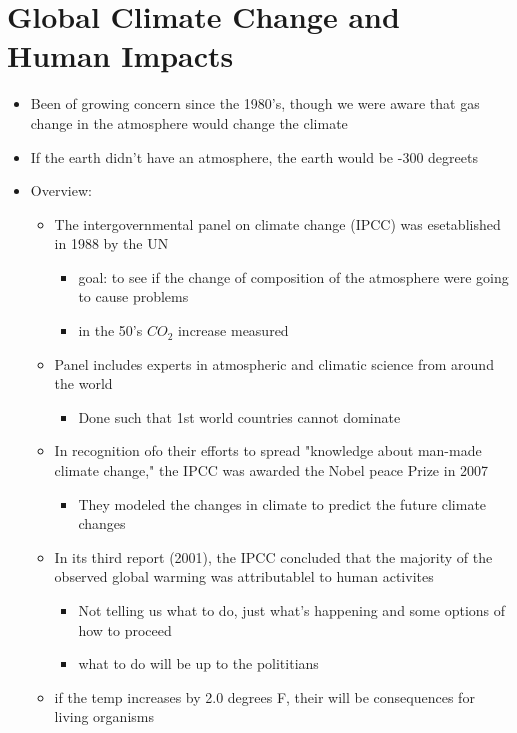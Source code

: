 \documentclass{article}
\theoremstyle{definition}
\begin{document}
\section{Global Climate Change and Human Impacts}

\begin{itemize}
	\item Been of growing concern since the 1980's, though we were aware that gas change in the atmosphere would change the climate
	\item If the earth didn't have an atmosphere, the earth would be -300 degreets
	\item Overview:
		\begin{itemize}
			\item The intergovernmental panel on climate change (IPCC) was esetablished in 1988 by the UN
				\begin{itemize}
					\item goal: to see if the change of composition of the atmosphere were going to cause problems
					\item in the 50's $CO_2$ increase measured
				\end{itemize}
			\item Panel includes experts in atmospheric and climatic science from around the world
				\begin{itemize}
					\item Done such that 1st world countries cannot dominate
				\end{itemize}
			\item In recognition ofo their efforts to spread "knowledge about man-made climate change," the IPCC was awarded the Nobel peace Prize in 2007
				\begin{itemize}
					\item They modeled the changes in climate to predict the future climate changes
				\end{itemize}
			\item  In its third report (2001), the IPCC concluded that the majority of the observed global warming was attributablel to human activites
				\begin{itemize}
					\item Not telling us what to do, just what's happening and some options of how to proceed
					\item what to do will be up to the polititians
				\end{itemize}
			\item if the temp increases by 2.0 degrees F, their will be consequences for living organisms

\end{itemize}
\end{itemize}
\end{document}

